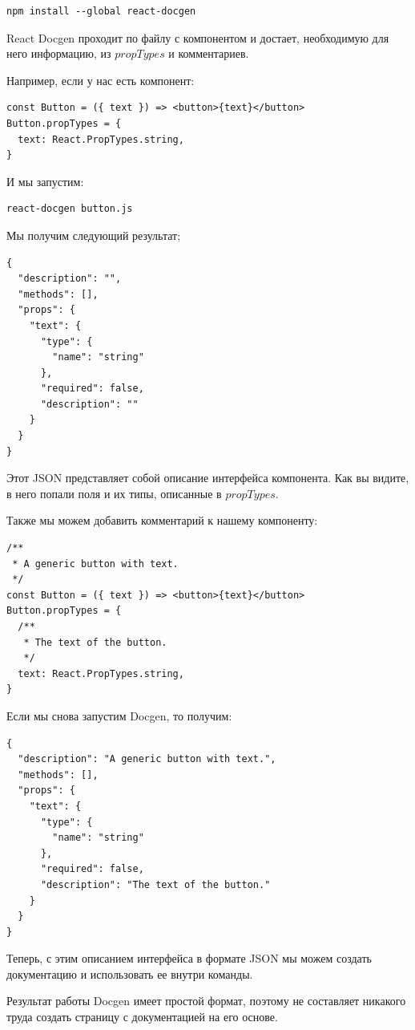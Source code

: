 \begin{lstlisting}
npm install --global react-docgen
\end{lstlisting}

React Docgen проходит по файлу с компонентом и достает, необходимую для него информацию, из $propTypes$ и комментариев.

Например, если у нас есть компонент:

\begin{lstlisting}
const Button = ({ text }) => <button>{text}</button>
Button.propTypes = {
  text: React.PropTypes.string,
}
\end{lstlisting}

И мы запустим:

\begin{lstlisting}
react-docgen button.js
\end{lstlisting}

Мы получим следующий результат;

\begin{lstlisting}
{
  "description": "",
  "methods": [],
  "props": {
    "text": {
      "type": {
        "name": "string" 
      },
      "required": false,
      "description": ""
    } 
  }
}
\end{lstlisting}

Этот JSON представляет собой описание интерфейса компонента. Как вы видите, в него попали поля и их типы, описанные в $propTypes$.

Также мы можем добавить комментарий к нашему компоненту:

\begin{lstlisting}
/**
 * A generic button with text.
 */
const Button = ({ text }) => <button>{text}</button>
Button.propTypes = {
  /**
   * The text of the button.
   */
  text: React.PropTypes.string,
}
\end{lstlisting}

Если мы снова запустим Docgen, то получим:

\begin{lstlisting}
{
  "description": "A generic button with text.",
  "methods": [],
  "props": {
    "text": {
      "type": {
        "name": "string"
      },
      "required": false,
      "description": "The text of the button."
    }
  }
}
\end{lstlisting}

Теперь, с этим описанием интерфейса в формате JSON мы можем создать документацию и использовать ее внутри команды.

Результат работы Docgen имеет простой формат, поэтому не составляет никакого труда создать страницу с документацией на его основе.

